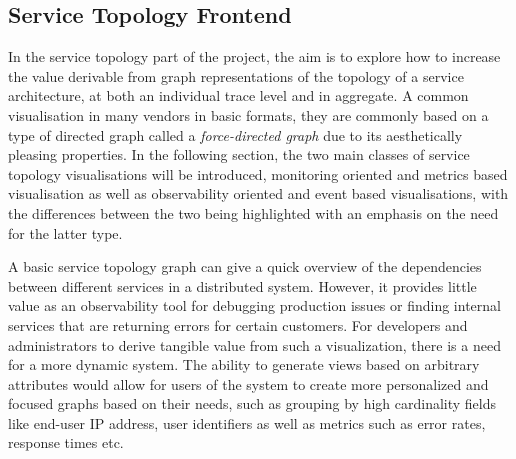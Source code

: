 \documentclass[12pt,pdftex,titlepage]{report}
\begin{document}
            \newpage
            \subsection{Service Topology Frontend}
                In the service topology part of the project, the aim is to explore how to increase the value derivable from graph representations of the topology of a service architecture, at 
                both an individual trace level and in aggregate. A common visualisation in many vendors in basic formats, they are commonly based on a type of directed graph called a 
                \textit{force-directed graph} due to its aesthetically pleasing properties. In the following section, the two main classes of service topology visualisations will be introduced,
                monitoring oriented and metrics based visualisation as well as observability oriented and event based visualisations, with the differences between the two being highlighted with an 
                emphasis on the need for the latter type.
        
                A basic service topology graph can give a quick overview of the dependencies between different services in a distributed system. However, it provides little value as an observability tool
                for debugging production issues or finding internal services that are returning errors for certain customers. For developers and administrators to derive tangible value from such a 
                visualization, there is a need for a more dynamic system. The ability to generate views based on arbitrary attributes would allow for users of the system to create more personalized and 
                focused graphs based on their needs, such as grouping by high cardinality fields like end-user IP address, user identifiers as well as metrics such as error rates, response times 
                etc\cite{doingitwrongtopo}.
\end{document}

